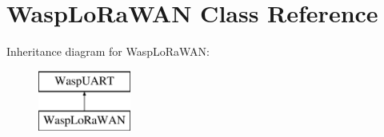 \hypertarget{class_wasp_lo_ra_w_a_n}{}\section{Wasp\+Lo\+Ra\+W\+AN Class Reference}
\label{class_wasp_lo_ra_w_a_n}
Inheritance diagram for Wasp\+Lo\+Ra\+W\+AN\+:\begin{figure}[H]
\begin{center}
\leavevmode
\includegraphics[height=2.000000cm]{class_wasp_lo_ra_w_a_n}
\end{center}
\end{figure}
